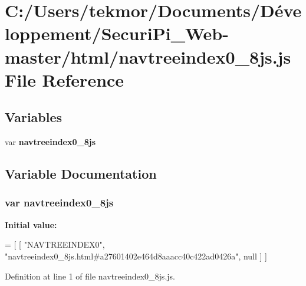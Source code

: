 \section{C\+:/\+Users/tekmor/\+Documents/\+Développement/\+Securi\+Pi\+\_\+\+Web-\/master/html/navtreeindex0\+\_\+8js.js File Reference}
\label{navtreeindex0__8js_8js}
\subsection*{Variables}
\begin{DoxyCompactItemize}
\item 
var {\bf navtreeindex0\+\_\+8js}
\end{DoxyCompactItemize}


\subsection{Variable Documentation}
\subsubsection[{navtreeindex0\+\_\+8js}]{\setlength{\rightskip}{0pt plus 5cm}var navtreeindex0\+\_\+8js}\label{navtreeindex0__8js_8js_a98335bb5419c36b2757c391bf71cffc7}
{\bfseries Initial value\+:}
\begin{DoxyCode}
=
[
    [ \textcolor{stringliteral}{"NAVTREEINDEX0"}, \textcolor{stringliteral}{"navtreeindex0\_8js.html#a27601402e464d8aaacc40c422ad0426a"}, null ]
]
\end{DoxyCode}


Definition at line 1 of file navtreeindex0\+\_\+8js.\+js.

